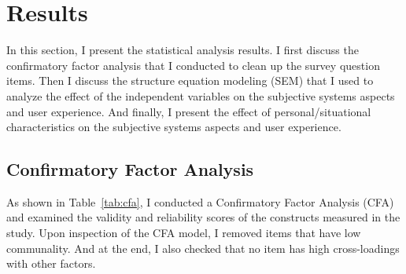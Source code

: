 

\section{Results}
In this section, I present the statistical analysis results. I first discuss the confirmatory factor analysis that I conducted to clean up the survey question items. Then I discuss the structure equation modeling (SEM) that I used to analyze the effect of the independent variables on the subjective systems aspects and user experience. And finally, I present the effect of personal/situational characteristics on the subjective systems aspects and user experience.

\subsection{Confirmatory Factor Analysis}
As shown in Table~\ref{tab:cfa}, I conducted a Confirmatory Factor Analysis (CFA) and examined the validity and reliability scores of the constructs measured in the study. Upon inspection of the CFA model, I removed items that have low communality. And at the end, I also checked that no item has high cross-loadings with other factors. %

